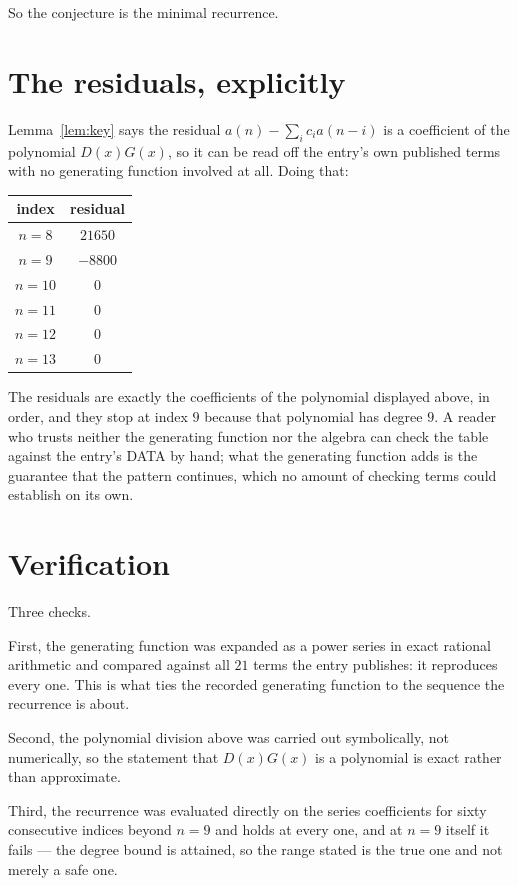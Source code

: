 \documentclass[11pt,a4paper]{article}
\theoremstyle{plain}
\theoremstyle{definition}
\begin{document}
So the conjecture is the minimal recurrence.

\section{The residuals, explicitly}

Lemma~\ref{lem:key} says the residual $a(n)-\sum_ic_ia(n-i)$ is a coefficient of the
polynomial $D(x)G(x)$, so it can be read off the entry's own published terms with no
generating function involved at all. Doing that:
\begin{center}
\begin{tabular}{cc}
index & residual \\ \hline
$n=8$ & $21650$ \\
$n=9$ & $-8800$ \\
$n=10$ & $0$ \\
$n=11$ & $0$ \\
$n=12$ & $0$ \\
$n=13$ & $0$
\end{tabular}
\end{center}
The residuals are exactly the coefficients of the polynomial displayed above, in order, and
they stop at index $9$ because that polynomial has degree $9$. A reader who trusts
neither the generating function nor the algebra can check the table against the entry's DATA
by hand; what the generating function adds is the guarantee that the pattern continues, which
no amount of checking terms could establish on its own.

\section{Verification}

Three checks.

First, the generating function was expanded as a power series in exact rational arithmetic and
compared against all $21$ terms the entry publishes: it reproduces every one. This is
what ties the recorded generating function to the sequence the recurrence is about.

Second, the polynomial division above was carried out symbolically, not numerically, so the
statement that $D(x)G(x)$ is a polynomial is exact rather than approximate.

Third, the recurrence was evaluated directly on the series coefficients for sixty consecutive
indices beyond $n=9$ and holds at every one, and at $n=9$ itself it fails --- the
degree bound is attained, so the range stated is the true one and not merely a safe one.
\end{document}

